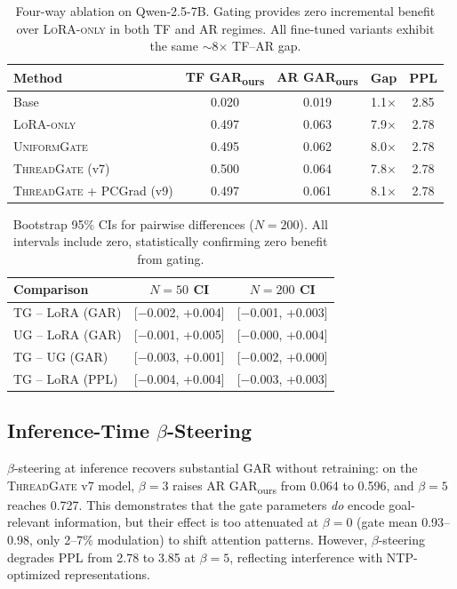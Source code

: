 \documentclass[11pt]{article}
\newcommand{\gar}{\textsc{GAR}}
\newcommand{\garours}{\textsc{GAR}\textsubscript{ours}}
\newcommand{\tg}{\textsc{ThreadGate}}
\newcommand{\ug}{\textsc{UniformGate}}
\newcommand{\lo}{\textsc{LoRA-only}}
\begin{document}
\begin{table}[t]
\centering
\small
\caption{Four-way ablation on Qwen-2.5-7B. Gating provides zero incremental benefit over \lo{} in both TF and AR regimes. All fine-tuned variants exhibit the same ${\sim}$8$\times$ TF--AR gap.}
\label{tab:main}
\begin{tabular}{lcccc}
\toprule
\textbf{Method} & \textbf{TF \garours{}} & \textbf{AR \garours{}} & \textbf{Gap} & \textbf{PPL} \\
\midrule
Base & 0.020 & 0.019 & 1.1$\times$ & 2.85 \\
\lo{} & 0.497 & 0.063 & 7.9$\times$ & 2.78 \\
\ug{} & 0.495 & 0.062 & 8.0$\times$ & 2.78 \\
\tg{} (v7) & 0.500 & 0.064 & 7.8$\times$ & 2.78 \\
\tg{} + PCGrad (v9) & 0.497 & 0.061 & 8.1$\times$ & 2.78 \\
\bottomrule
\end{tabular}
\end{table}

\begin{table}[t]
\centering
\small
\caption{Bootstrap 95\% CIs for pairwise differences ($N=200$). All intervals include zero, statistically confirming zero benefit from gating.}
\label{tab:ci}
\begin{tabular}{lcc}
\toprule
\textbf{Comparison} & \textbf{$N{=}50$ CI} & \textbf{$N{=}200$ CI} \\
\midrule
TG -- LoRA (\gar{}) & [$-$0.002, +0.004] & [$-$0.001, +0.003] \\
UG -- LoRA (\gar{}) & [$-$0.001, +0.005] & [$-$0.000, +0.004] \\
TG -- UG (\gar{}) & [$-$0.003, +0.001] & [$-$0.002, +0.000] \\
TG -- LoRA (PPL) & [$-$0.004, +0.004] & [$-$0.003, +0.003] \\
\bottomrule
\end{tabular}
\end{table}

\subsection{Inference-Time $\beta$-Steering}

$\beta$-steering at inference recovers substantial \gar{} without retraining: on the \tg{} v7 model, $\beta=3$ raises AR \garours{} from 0.064 to 0.596, and $\beta=5$ reaches 0.727. This demonstrates that the gate parameters \emph{do} encode goal-relevant information, but their effect is too attenuated at $\beta=0$ (gate mean 0.93--0.98, only 2--7\% modulation) to shift attention patterns. However, $\beta$-steering degrades PPL from 2.78 to 3.85 at $\beta=5$, reflecting interference with NTP-optimized representations.
\end{document}
